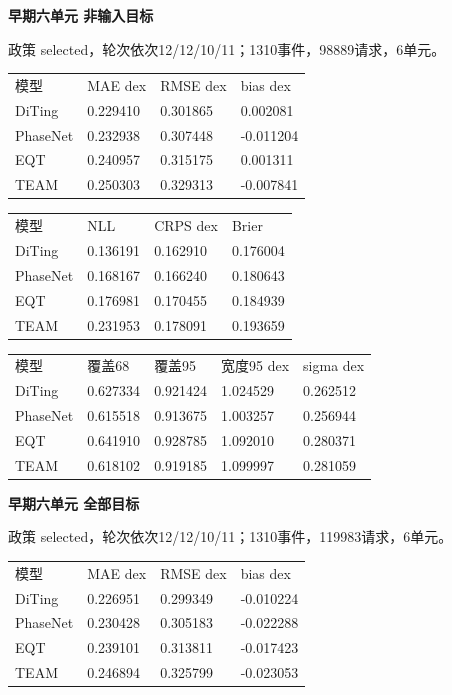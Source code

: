 \documentclass[UTF8,a4paper,11pt]{ctexart}
\begin{document}
\par\textbf{早期六单元 非输入目标}\par

政策 selected，轮次依次12/12/10/11；1310事件，98889请求，6单元。

\begin{longtable}{llll}
模型 & MAE dex & RMSE dex & bias dex \\
DiTing & 0.229410 & 0.301865 & 0.002081 \\
PhaseNet & 0.232938 & 0.307448 & -0.011204 \\
EQT & 0.240957 & 0.315175 & 0.001311 \\
TEAM & 0.250303 & 0.329313 & -0.007841 \\
\end{longtable}

\begin{longtable}{llll}
模型 & NLL & CRPS dex & Brier \\
DiTing & 0.136191 & 0.162910 & 0.176004 \\
PhaseNet & 0.168167 & 0.166240 & 0.180643 \\
EQT & 0.176981 & 0.170455 & 0.184939 \\
TEAM & 0.231953 & 0.178091 & 0.193659 \\
\end{longtable}

\begin{longtable}{lllll}
模型 & 覆盖68 & 覆盖95 & 宽度95 dex & sigma dex \\
DiTing & 0.627334 & 0.921424 & 1.024529 & 0.262512 \\
PhaseNet & 0.615518 & 0.913675 & 1.003257 & 0.256944 \\
EQT & 0.641910 & 0.928785 & 1.092010 & 0.280371 \\
TEAM & 0.618102 & 0.919185 & 1.099997 & 0.281059 \\
\end{longtable}


\par\textbf{早期六单元 全部目标}\par

政策 selected，轮次依次12/12/10/11；1310事件，119983请求，6单元。

\begin{longtable}{llll}
模型 & MAE dex & RMSE dex & bias dex \\
DiTing & 0.226951 & 0.299349 & -0.010224 \\
PhaseNet & 0.230428 & 0.305183 & -0.022288 \\
EQT & 0.239101 & 0.313811 & -0.017423 \\
TEAM & 0.246894 & 0.325799 & -0.023053 \\
\end{longtable}
\end{document}
